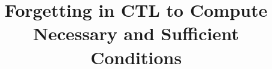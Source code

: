 \documentclass{article}
\title{Forgetting in CTL to Compute Necessary and Sufficient Conditions}
\begin{document}
\newcommand{\tuple}[1]{{\langle{#1}\rangle}}
\newcommand{\Mod}{\textit{Mod}}
\newcommand\ie{{\it i.e. }}
\newcommand\eg{{\it e.g.}}
\newtheorem{definition}{Definition}
\newtheorem{examp}{Example}
\newenvironment{example}{\begin{examp}\rm}{\end{examp}}
\newtheorem{lemma}{Lemma}
\newtheorem{proposition}{Proposition}
\newtheorem{theorem}{Theorem}
\newtheorem{corollary}[theorem]{Corollary}
\newenvironment{proof}{{\bf Proof:}}{\hfill\rule{2mm}{2mm}\\ }
\newcommand{\rto}{\rightarrow}
\newcommand{\lto}{\leftarrow}
\newcommand{\lrto}{\leftrightarrow}
\newcommand{\Rto}{\Rightarrow}
\newcommand{\Lto}{\Leftarrow}
\newcommand{\LRto}{\Leftrightarrow}
\newcommand{\Var}{\textit{Var}}
\newcommand{\Forget}{\textit{Forget}}
\newcommand{\KForget}{\textit{KForget}}
\newcommand{\TForget}{\textit{TForget}}
\newcommand{\Fst}{\textit{Fst}}
\newcommand{\dep}{\textit{dep}}
\newcommand{\term}{\textit{term}}
\newcommand{\literal}{\textit{literal}}

\newcommand{\Atom}{\mathcal{A}}
\newcommand{\SFive}{\textbf{S5}}
\newcommand{\MPK}{\textsc{k}}
\newcommand{\MPB}{\textsc{b}}
\newcommand{\MPT}{\textsc{t}}
\newcommand{\MPA}{\forall}
\newcommand{\MPE}{\exists}

\newcommand{\DNF}{\textit{DNF}}
\newcommand{\CNF}{\textit{CNF}}

\newcommand{\degree}{\textit{degree}}
\newcommand{\sunfold}{\textit{sunfold}}

\newcommand{\Pos}{\textit{Pos}}
\newcommand{\Neg}{\textit{Neg}}
\newcommand\wrt{{\it w.r.t.}}
\newcommand{\Hm} {{\cal M}}
\newcommand{\Hw} {{\cal W}}
\newcommand{\Hr} {{\cal R}}
\newcommand{\Hb} {{\cal B}}
\newcommand{\Ha} {{\cal A}}

\newcommand{\Dsj}{\triangledown}

\newcommand{\wnext}{\widetilde{\bigcirc}}
\newcommand{\nex}{\bigcirc}
\newcommand{\ness}{\square}
\newcommand{\qness}{\boxminus}
\newcommand{\wqnext}{\widetilde{\circleddash}}
\newcommand{\qnext}{\circleddash}
\newcommand{\may}{\lozenge}
\newcommand{\qmay}{\blacklozenge}
\newcommand{\unt} {{\cal U}}
\newcommand{\since} {{\cal S}}
\newcommand{\SNF} {\textit{SNF$_C$}}
\newcommand{\start}{\textbf{start}}
\newcommand{\Elm}{\textit{Elm}}
\newcommand{\simp}{\textbf{simp}}
\newcommand{\nnf}{\textbf{nnf}}

\newcommand{\CTL}{\textrm{CTL}}
\newcommand{\Ind}{\textrm{Ind}}
\newcommand{\Tran}{\textrm{Tran}}
\newcommand{\Sub}{\textrm{Sub}}
\newcommand{\forget}{{\textsc{f}_\CTL}}
\newcommand{\ALL}{\textsc{a}}
\newcommand{\EXIST}{\textsc{e}}
\newcommand{\NEXT}{\textsc{x}}
\newcommand{\FUTURE}{\textsc{f}}
\newcommand{\UNTIL}{\textsc{u}}
\newcommand{\GLOBAL}{\textsc{g}}
\newcommand{\UNLESS}{\textsc{w}}
\newcommand{\Def}{\textrm{def}}
\newcommand{\IR}{\textrm{IR}}
\newcommand{\Tr}{\textrm{Tr}}
\newcommand{\dis}{\textrm{dis}}
\def\PP{\ensuremath{\textbf{PP}}}
\def\NgP{\ensuremath{\textbf{NP}}}
\def\W{\ensuremath{\textbf{W}}}
\newcommand{\Pre}{\textrm{Pre}}
\newcommand{\Post}{\textrm{Post}}
\end{document}
